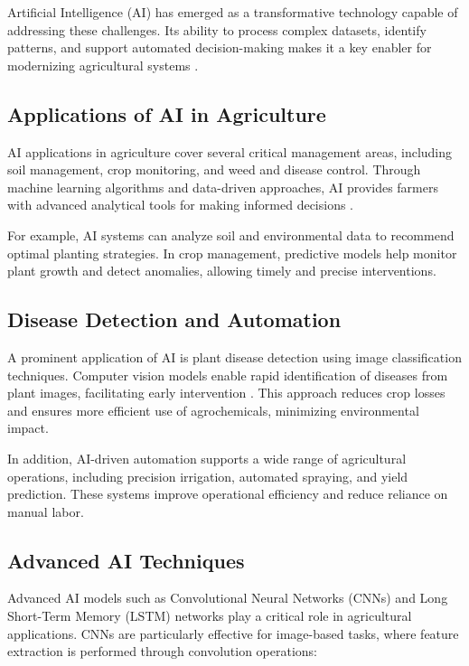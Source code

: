 Artificial Intelligence (AI) has emerged as a transformative technology capable of addressing these challenges. Its ability to process complex datasets, identify patterns, and support automated decision-making makes it a key enabler for modernizing agricultural systems \cite{Liakos2018}.

\subsection{Applications of AI in Agriculture}

AI applications in agriculture cover several critical management areas, including soil management, crop monitoring, and weed and disease control. Through machine learning algorithms and data-driven approaches, AI provides farmers with advanced analytical tools for making informed decisions \cite{Kamilaris2018}.

For example, AI systems can analyze soil and environmental data to recommend optimal planting strategies. In crop management, predictive models help monitor plant growth and detect anomalies, allowing timely and precise interventions.

\subsection{Disease Detection and Automation}

A prominent application of AI is plant disease detection using image classification techniques. Computer vision models enable rapid identification of diseases from plant images, facilitating early intervention \cite{Mohanty2016}. This approach reduces crop losses and ensures more efficient use of agrochemicals, minimizing environmental impact.

In addition, AI-driven automation supports a wide range of agricultural operations, including precision irrigation, automated spraying, and yield prediction. These systems improve operational efficiency and reduce reliance on manual labor.

\subsection{Advanced AI Techniques}

Advanced AI models such as Convolutional Neural Networks (CNNs) and Long Short-Term Memory (LSTM) networks play a critical role in agricultural applications. CNNs are particularly effective for image-based tasks, where feature extraction is performed through convolution operations:

